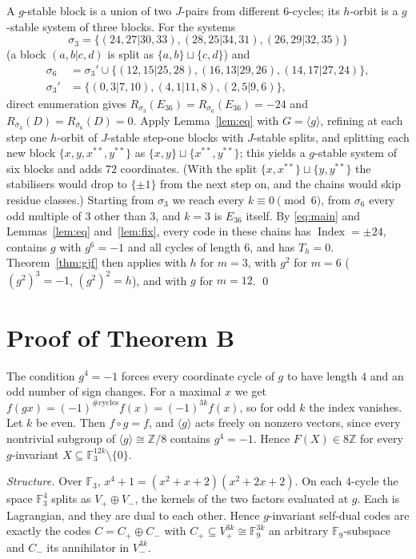 \documentclass[11pt]{amsart}
\theoremstyle{definition}
\newcommand{\F}{\mathbb{F}_3}
\newcommand{\Fn}{\mathbb{F}_9}
\newcommand{\Index}{\operatorname{Index}}
\begin{document}
A $g$-stable block is a union of two $J$-pairs from different $6$-cycles; its $h$-orbit is a
$g$-stable system of three blocks. For the systems
\[
\sigma_3=\{(24,27|30,33),(28,25|34,31),(26,29|32,35)\}
\]
(a block $(a,b|c,d)$ is split as $\{a,b\}\sqcup\{c,d\}$) and
\begin{align*}
\sigma_6&=\sigma_3'\cup\{(12,15|25,28),(16,13|29,26),(14,17|27,24)\},\\
\sigma_3'&=\{(0,3|7,10),(4,1|11,8),(2,5|9,6)\},
\end{align*}
direct enumeration gives $R_{\sigma_3}(E_{36})=R_{\sigma_6}(E_{36})=-24$ and
$R_{\bar\sigma_3}(D)=R_{\bar\sigma_6}(D)=0$. Apply Lemma~\ref{lem:eq} with $G=\langle g\rangle$,
refining at each step one $h$-orbit of $J$-stable step-one blocks with $J$-stable splits, and
splitting each new block $\{x,y,x^{**},y^{**}\}$ as $\{x,y\}\sqcup\{x^{**},y^{**}\}$; this
yields a $g$-stable system of six blocks and adds $72$ coordinates. (With the split
$\{x,x^{**}\}\sqcup\{y,y^{**}\}$ the stabilisers would drop to $\{\pm1\}$ from the next step on, and the
chains would skip residue classes.) Starting from $\sigma_3$ we
reach every $k\equiv0\pmod6$, from $\sigma_6$ every odd multiple of $3$ other than $3$, and $k=3$ is
$E_{36}$ itself. By \eqref{eq:main} and Lemmas~\ref{lem:eq} and~\ref{lem:fix}, every code in these
chains has $\Index=\pm24$, contains $g$ with $g^6=-1$ and all cycles of length $6$, and has
$T_h=0$. Theorem~\ref{thm:gjf} then applies with $h$ for $m=3$, with $g^2$ for $m=6$
($(g^2)^3=-1$, $(g^2)^2=h$), and with $g$ for $m=12$. \qed

\section{Proof of Theorem B}

The condition $g^4=-1$ forces every coordinate cycle of $g$ to have length $4$ and an odd number
of sign changes. For a maximal $x$ we get $f(gx)=(-1)^{\#\mathrm{cycles}}f(x)=(-1)^{3k}f(x)$, so
for odd $k$ the index vanishes. Let $k$ be even. Then $f\circ g=f$, and $\langle g\rangle$ acts freely on
nonzero vectors, since every nontrivial subgroup of $\langle g\rangle\cong\mathbb Z/8$ contains
$g^4=-1$. Hence $F(X)\in8\mathbb Z$ for every $g$-invariant
$X\subseteq\F^{12k}\setminus\{0\}$.

\emph{Structure.} Over $\F$, $x^4+1=(x^2+x+2)(x^2+2x+2)$. On each $4$-cycle the space $\F^4$
splits as $V_+\oplus V_-$, the kernels of the two factors evaluated at $g$. Each is Lagrangian,
and they are dual to each other. Hence $g$-invariant self-dual codes are exactly the codes
$C=C_+\oplus C_-$ with $C_+\subseteq V_+^{3k}\cong\Fn^{3k}$ an arbitrary $\Fn$-subspace and $C_-$ its
annihilator in $V_-^{3k}$.
\end{document}
